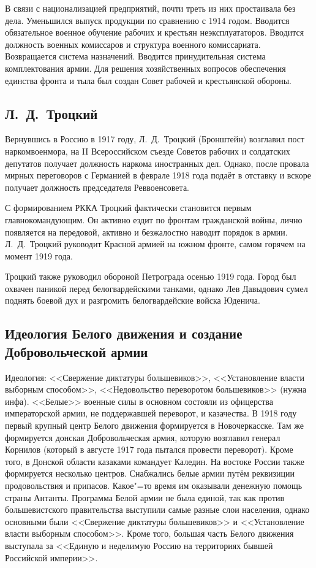 В связи с национализацией предприятий, почти треть из них простаивала без дела. Уменьшился выпуск продукции по сравнению с 1914 годом.
Вводится обязательное военное обучение рабочих и крестьян неэксплуататоров. Вводится должность военных комиссаров и структура военного комиссариата. Возвращается система назначений. Вводится принудительная система комплектования армии.
Для решения хозяйственных вопросов обеспечения единства фронта и тыла был создан Совет рабочей и крестьянской обороны.

\subsection{Л.~Д.~Троцкий}	

Вернувшись в Россию в 1917 году, Л.~Д.~Троцкий (Бронштейн) возглавил пост наркомвоенмора, на II Всероссийском съезде Советов рабочих и солдатских депутатов получает должность наркома иностранных дел. Однако, после провала мирных переговоров с Германией в феврале 1918 года подаёт в отставку и вскоре получает должность председателя Реввоенсовета. 

С формированием РККА Троцкий фактически становится первым главнокомандующим. Он активно ездит по фронтам гражданской войны, лично появляется на передовой, активно и безжалостно наводит порядок в армии. Л.~Д.~Троцкий руководит Красной армией на южном фронте, самом горячем на момент 1919 года.

Троцкий также руководил обороной Петрограда осенью 1919 года. Город был охвачен паникой перед белогвардейскими танками, однако Лев Давыдович сумел поднять боевой дух и разгромить белогвардейские войска Юденича.

\subsection{Идеология Белого движения и создание Добровольческой армии}
Идеология: <<Свержение диктатуры большевиков>>, <<Установление власти выборным способом>>, <<Недовольство переворотом большевиков>> (нужна инфа).
<<Белые>> военные силы в основном состояли из офицерства императорской армии, не поддержавшей переворот, и казачества. В 1918 году первый крупный центр Белого движения формируется в Новочеркасске. Там же формируется донская Добровольческая армия, которую возглавил генерал Корнилов (который в августе 1917 года пытался провести переворот). Кроме того, в Донской области казаками командует Каледин. На востоке России также формируется несколько центров.
Снабжались белые армии путём реквизиции продовольствия и припасов. Какое"=то время им оказывали денежную помощь страны Антанты.
Программа Белой армии не была единой, так как против большевистского правительства выступили самые разные слои населения, однако основными были <<Свержение диктатуры большевиков>> и <<Установление власти выборным способом>>. Кроме того, большая часть Белого движения выступала за <<Единую и неделимую Россию на территориях бывшей Российской империи>>.

